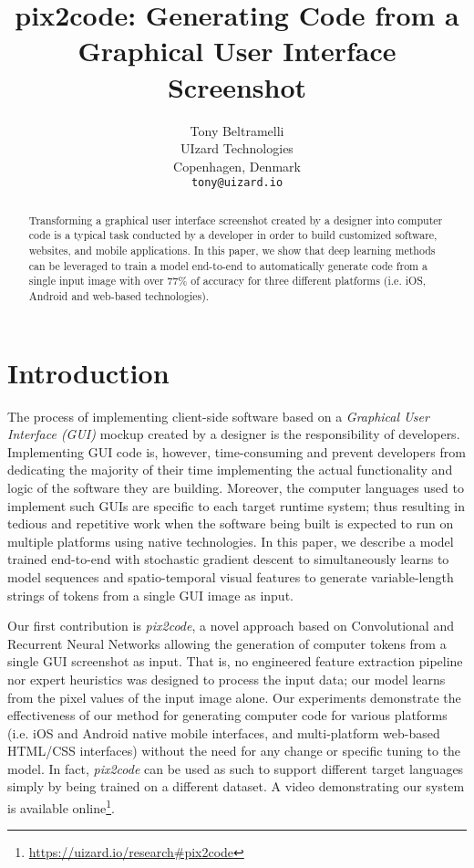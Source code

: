 \documentclass{article}
\title{pix2code: Generating Code from a Graphical User Interface Screenshot}
\author{
    Tony Beltramelli \\
    UIzard Technologies\\
    Copenhagen, Denmark\\
    \texttt{tony@uizard.io}
}
\begin{document}
\maketitle

\begin{abstract}
Transforming a graphical user interface screenshot created by a designer into computer code is a typical task conducted by a developer in order to build customized software, websites, and mobile applications. In this paper, we show that deep learning methods can be leveraged to train a model end-to-end to automatically generate code from a single input image with over 77\% of accuracy for three different platforms (i.e. iOS, Android and web-based technologies).
\end{abstract}

\section{Introduction}

The process of implementing client-side software based on a \emph{Graphical User Interface (GUI)} mockup created by a designer is the responsibility of developers. Implementing GUI code is, however, time-consuming and prevent developers from dedicating the majority of their time implementing the actual functionality and logic of the software they are building. Moreover, the computer languages used to implement such GUIs are specific to each target runtime system; thus resulting in tedious and repetitive work when the software being built is expected to run on multiple platforms using native technologies. In this paper, we describe a model trained end-to-end with stochastic gradient descent to simultaneously learns to model sequences and spatio-temporal visual features to generate variable-length strings of tokens from a single GUI image as input.

Our first contribution is \emph{pix2code}, a novel approach based on Convolutional and Recurrent Neural Networks allowing the generation of computer tokens from a single GUI screenshot as input. That is, no engineered feature extraction pipeline nor expert heuristics was designed to process the input data; our model learns from the pixel values of the input image alone. Our experiments demonstrate the effectiveness of our method for generating computer code for various platforms (i.e. iOS and Android native mobile interfaces, and multi-platform web-based HTML/CSS interfaces) without the need for any change or specific tuning to the model. In fact, \emph{pix2code} can be used as such to support different target languages simply by being trained on a different dataset. A video demonstrating our system is available online\footnote{\url{https://uizard.io/research\#pix2code}}.
\end{document}
